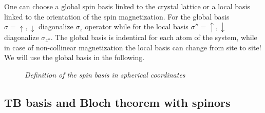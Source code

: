 \documentclass{article}
\begin{document}
\noindent
One can choose a global spin basis linked to the crystal lattice or a local basis linked to the orientation of the spin magnetization. For the global basis
$\sigma=\uparrow, \downarrow$ diagonalize $\sigma_z$ operator while for the local basis $\sigma''=\uparrow, \downarrow$ diagonalize $\sigma_{z''}$.
The global basis is indentical for each atom of the system, while in case of non-collinear magnetization the local basis can change from site to site! We will use the global basis in the following.


%
%
\begin{figure}[!ht]
\begin{center}
\caption{\sl Definition of the spin basis in spherical coordinates}
\label{fig:spherical_coordinates}
\end{center}
\end{figure}

\subsection{TB basis and Bloch theorem with spinors}
\end{document}
